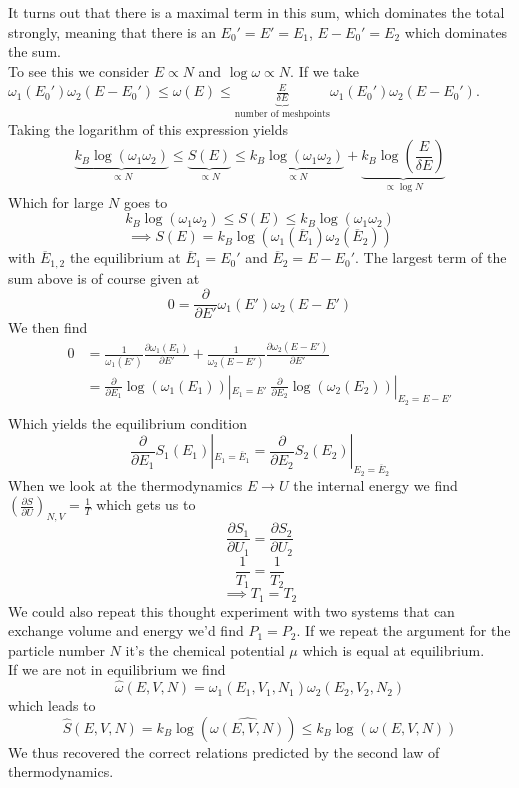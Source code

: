 \documentclass{report}
\begin{document}
It turns out that there is a maximal term in this sum, which dominates the total strongly, meaning that there is an $E_0' = E' = E_1$, $E-E_0' = E_2$ which dominates the sum.\\
To see this we consider $E \propto N$ and $\log \omega \propto N$. If we take $\omega_1\left( E_0' \right) \omega_2\left( E- E_0' \right) \le \omega\left( E \right) \le \underbrace{\frac{E}{\delta E}}_{\text{number of meshpoints}} \omega_1\left( E_0' \right) \omega_2\left( E - E_0' \right) $. Taking the logarithm of this expression yields \[
  \underbrace{k_B \log\left( \omega_1 \omega_2 \right)}_{\propto N} \le \underbrace{S\left( E \right)}_{\propto N} \le \underbrace{k_B \log\left( \omega_1 \omega_2 \right)}_{\propto N} +\underbrace{k_B \log\left( \frac{E}{\delta E} \right) }_{\propto \log N}
\] Which for large $N$ goes to \[
k_B \log\left( \omega_1 \omega_2 \right) \le S\left( E \right) \le k_B \log\left( \omega_1 \omega_2 \right)
\] \[
\implies S\left( E \right) = k_B \log\left( \omega_1\left( \overline{E}_1 \right) \omega_2\left( \overline{E}_2 \right)  \right) 
\] with $\overline{E}_{1,2}$ the equilibrium at $\overline{E}_1 = E_0'$ and $\overline{E}_2 = E - E_0'$.
The largest term of the sum above is of course given at \[
  0 = \frac{\partial }{\partial E' } \omega_1\left( E' \right) \omega_2\left( E - E' \right) 
\] We then find 
\begin{align*}
  0 &= \frac{1}{\omega_1\left( E' \right) } \frac{\partial \omega_1\left( E_1 \right)  }{\partial E' }+ \frac{1}{\omega_2\left( E - E' \right) } \frac{\partial \omega_2\left( E - E' \right)  }{\partial E' } \\
    &= \frac{\partial }{\partial E_1 } \log \left( \omega_1\left( E_1 \right)  \right) |_{E_1 = E'} \ \frac{\partial }{\partial E_2 } \log\left( \omega_2\left( E_2 \right)  \right) |_{E_2 = E - E'} \\
\end{align*}
Which yields the equilibrium condition \[
  \frac{\partial }{\partial E_1 } S_1\left( E_1 \right) |_{E_1 = \overline{E}_1} = \frac{\partial }{\partial E_2 } S_2\left( E_2 \right) |_{E_2 = \overline{E}_2}
\] 
When we look at the thermodynamics $E \to U$ the internal energy we find $\left( \frac{\partial S }{\partial U } \right)_{N,V} = \frac{1}{T}$ which gets us to \[
\frac{\partial S_1 }{\partial U_1 } = \frac{\partial S_2 }{\partial U_2 }
\] \[
\frac{1}{T_1} = \frac{1}{T_2}
\] \[
\implies T_1 = T_2
\] 
We could also repeat this thought experiment with two systems that can exchange volume and energy we'd find $P_1 = P_2$. If we repeat the argument for the particle number $N$ it's the chemical potential $\mu$ which is equal at equilibrium.\\
If we are not in equilibrium we find \[
  \hat{\omega}\left( E,V,N \right) = \omega_1\left( E_1,V_1,N_1 \right) \omega_2\left( E_2,V_2,N_2 \right) 
\] which leads to \[
\hat{S}\left( E,V,N \right) = k_B \log\left( \hat{\omega\left( E,V,N \right) } \right) \le k_B \log\left( \omega\left( E,V,N \right)  \right) 
\] 
We thus recovered the correct relations predicted by the second law of thermodynamics.
\end{document}

